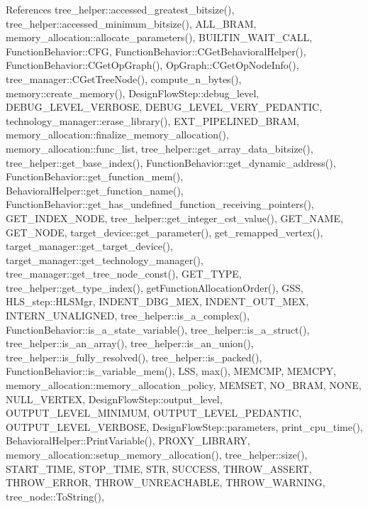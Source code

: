 References tree\+\_\+helper\+::accessed\+\_\+greatest\+\_\+bitsize(), tree\+\_\+helper\+::accessed\+\_\+minimum\+\_\+bitsize(), A\+L\+L\+\_\+\+B\+R\+AM, memory\+\_\+allocation\+::allocate\+\_\+parameters(), B\+U\+I\+L\+T\+I\+N\+\_\+\+W\+A\+I\+T\+\_\+\+C\+A\+LL, Function\+Behavior\+::\+C\+FG, Function\+Behavior\+::\+C\+Get\+Behavioral\+Helper(), Function\+Behavior\+::\+C\+Get\+Op\+Graph(), Op\+Graph\+::\+C\+Get\+Op\+Node\+Info(), tree\+\_\+manager\+::\+C\+Get\+Tree\+Node(), compute\+\_\+n\+\_\+bytes(), memory\+::create\+\_\+memory(), Design\+Flow\+Step\+::debug\+\_\+level, D\+E\+B\+U\+G\+\_\+\+L\+E\+V\+E\+L\+\_\+\+V\+E\+R\+B\+O\+SE, D\+E\+B\+U\+G\+\_\+\+L\+E\+V\+E\+L\+\_\+\+V\+E\+R\+Y\+\_\+\+P\+E\+D\+A\+N\+T\+IC, technology\+\_\+manager\+::erase\+\_\+library(), E\+X\+T\+\_\+\+P\+I\+P\+E\+L\+I\+N\+E\+D\+\_\+\+B\+R\+AM, memory\+\_\+allocation\+::finalize\+\_\+memory\+\_\+allocation(), memory\+\_\+allocation\+::func\+\_\+list, tree\+\_\+helper\+::get\+\_\+array\+\_\+data\+\_\+bitsize(), tree\+\_\+helper\+::get\+\_\+base\+\_\+index(), Function\+Behavior\+::get\+\_\+dynamic\+\_\+address(), Function\+Behavior\+::get\+\_\+function\+\_\+mem(), Behavioral\+Helper\+::get\+\_\+function\+\_\+name(), Function\+Behavior\+::get\+\_\+has\+\_\+undefined\+\_\+function\+\_\+receiving\+\_\+pointers(), G\+E\+T\+\_\+\+I\+N\+D\+E\+X\+\_\+\+N\+O\+DE, tree\+\_\+helper\+::get\+\_\+integer\+\_\+cst\+\_\+value(), G\+E\+T\+\_\+\+N\+A\+ME, G\+E\+T\+\_\+\+N\+O\+DE, target\+\_\+device\+::get\+\_\+parameter(), get\+\_\+remapped\+\_\+vertex(), target\+\_\+manager\+::get\+\_\+target\+\_\+device(), target\+\_\+manager\+::get\+\_\+technology\+\_\+manager(), tree\+\_\+manager\+::get\+\_\+tree\+\_\+node\+\_\+const(), G\+E\+T\+\_\+\+T\+Y\+PE, tree\+\_\+helper\+::get\+\_\+type\+\_\+index(), get\+Function\+Allocation\+Order(), G\+SS, H\+L\+S\+\_\+step\+::\+H\+L\+S\+Mgr, I\+N\+D\+E\+N\+T\+\_\+\+D\+B\+G\+\_\+\+M\+EX, I\+N\+D\+E\+N\+T\+\_\+\+O\+U\+T\+\_\+\+M\+EX, I\+N\+T\+E\+R\+N\+\_\+\+U\+N\+A\+L\+I\+G\+N\+ED, tree\+\_\+helper\+::is\+\_\+a\+\_\+complex(), Function\+Behavior\+::is\+\_\+a\+\_\+state\+\_\+variable(), tree\+\_\+helper\+::is\+\_\+a\+\_\+struct(), tree\+\_\+helper\+::is\+\_\+an\+\_\+array(), tree\+\_\+helper\+::is\+\_\+an\+\_\+union(), tree\+\_\+helper\+::is\+\_\+fully\+\_\+resolved(), tree\+\_\+helper\+::is\+\_\+packed(), Function\+Behavior\+::is\+\_\+variable\+\_\+mem(), L\+SS, max(), M\+E\+M\+C\+MP, M\+E\+M\+C\+PY, memory\+\_\+allocation\+::memory\+\_\+allocation\+\_\+policy, M\+E\+M\+S\+ET, N\+O\+\_\+\+B\+R\+AM, N\+O\+NE, N\+U\+L\+L\+\_\+\+V\+E\+R\+T\+EX, Design\+Flow\+Step\+::output\+\_\+level, O\+U\+T\+P\+U\+T\+\_\+\+L\+E\+V\+E\+L\+\_\+\+M\+I\+N\+I\+M\+UM, O\+U\+T\+P\+U\+T\+\_\+\+L\+E\+V\+E\+L\+\_\+\+P\+E\+D\+A\+N\+T\+IC, O\+U\+T\+P\+U\+T\+\_\+\+L\+E\+V\+E\+L\+\_\+\+V\+E\+R\+B\+O\+SE, Design\+Flow\+Step\+::parameters, print\+\_\+cpu\+\_\+time(), Behavioral\+Helper\+::\+Print\+Variable(), P\+R\+O\+X\+Y\+\_\+\+L\+I\+B\+R\+A\+RY, memory\+\_\+allocation\+::setup\+\_\+memory\+\_\+allocation(), tree\+\_\+helper\+::size(), S\+T\+A\+R\+T\+\_\+\+T\+I\+ME, S\+T\+O\+P\+\_\+\+T\+I\+ME, S\+TR, S\+U\+C\+C\+E\+SS, T\+H\+R\+O\+W\+\_\+\+A\+S\+S\+E\+RT, T\+H\+R\+O\+W\+\_\+\+E\+R\+R\+OR, T\+H\+R\+O\+W\+\_\+\+U\+N\+R\+E\+A\+C\+H\+A\+B\+LE, T\+H\+R\+O\+W\+\_\+\+W\+A\+R\+N\+I\+NG, tree\+\_\+node\+::\+To\+String(), 